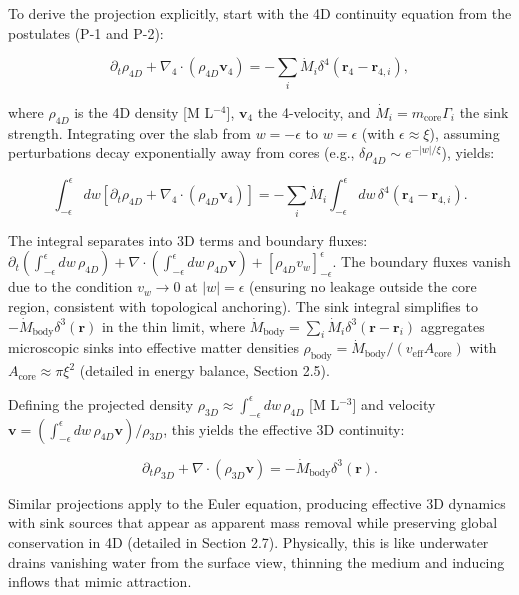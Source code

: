 To derive the projection explicitly, start with the 4D continuity equation from the postulates (P-1 and P-2):

\begin{equation}
\partial_t \rho_{4D} + \nabla_4 \cdot (\rho_{4D} \mathbf{v}_4) = -\sum_i \dot{M}_i \delta^4(\mathbf{r}_4 - \mathbf{r}_{4,i}),
\end{equation}

where $\rho_{4D}$ is the 4D density [M L$^{-4}$], $\mathbf{v}_4$ the 4-velocity, and $\dot{M}_i = m_{\text{core}} \Gamma_i$ the sink strength. Integrating over the slab from $w=-\epsilon$ to $w=\epsilon$ (with $\epsilon \approx \xi$), assuming perturbations decay exponentially away from cores (e.g., $\delta \rho_{4D} \sim e^{-|w|/\xi}$), yields:

\[
\int_{-\epsilon}^{\epsilon} dw \left[ \partial_t \rho_{4D} + \nabla_4 \cdot (\rho_{4D} \mathbf{v}_4) \right] = -\sum_i \dot{M}_i \int_{-\epsilon}^{\epsilon} dw \, \delta^4(\mathbf{r}_4 - \mathbf{r}_{4,i}).
\]

The integral separates into 3D terms and boundary fluxes: $\partial_t \left( \int_{-\epsilon}^{\epsilon} dw \, \rho_{4D} \right) + \nabla \cdot \left( \int_{-\epsilon}^{\epsilon} dw \, \rho_{4D} \mathbf{v} \right) + [\rho_{4D} v_w]_{-\epsilon}^{\epsilon}$. The boundary fluxes vanish due to the condition $v_w \to 0$ at $|w| = \epsilon$ (ensuring no leakage outside the core region, consistent with topological anchoring). The sink integral simplifies to $-\dot{M}_{\text{body}} \delta^3(\mathbf{r})$ in the thin limit, where $\dot{M}_{\text{body}} = \sum_i \dot{M}_i \delta^3(\mathbf{r} - \mathbf{r}_i)$ aggregates microscopic sinks into effective matter densities $\rho_{\text{body}} = \dot{M}_{\text{body}} / (v_{\text{eff}} A_{\text{core}})$ with $A_{\text{core}} \approx \pi \xi^2$ (detailed in energy balance, Section 2.5).

Defining the projected density $\rho_{3D} \approx \int_{-\epsilon}^{\epsilon} dw \, \rho_{4D}$ [M L$^{-3}$] and velocity $\mathbf{v} = \left( \int_{-\epsilon}^{\epsilon} dw \, \rho_{4D} \mathbf{v} \right) / \rho_{3D}$, this yields the effective 3D continuity:

\[
\partial_t \rho_{3D} + \nabla \cdot (\rho_{3D} \mathbf{v}) = -\dot{M}_{\text{body}} \delta^3(\mathbf{r}).
\]

Similar projections apply to the Euler equation, producing effective 3D dynamics with sink sources that appear as apparent mass removal while preserving global conservation in 4D (detailed in Section 2.7). Physically, this is like underwater drains vanishing water from the surface view, thinning the medium and inducing inflows that mimic attraction.

